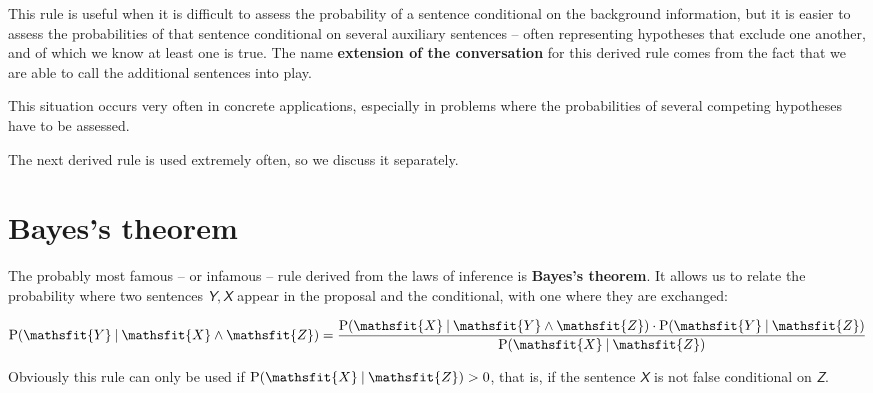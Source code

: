 \documentclass[
  a4paper,
  DIV=11,
  numbers=noendperiod,
  oneside]{scrreprt}
\begin{document}
This rule is useful when it is difficult to assess the probability of a
sentence conditional on the background information, but it is easier to
assess the probabilities of that sentence conditional on several
auxiliary sentences -- often representing hypotheses that exclude one
another, and of which we know at least one is true. The name
{\textbf{extension of the conversation}} for this derived rule comes
from the fact that we are able to call the additional sentences into
play.

This situation occurs very often in concrete applications, especially in
problems where the probabilities of several competing hypotheses have to
be assessed.

The next derived rule is used extremely often, so we discuss it
separately.

\hypertarget{sec-bayes-theorem}{%
\section{Bayes's theorem}\label{sec-bayes-theorem}}

The probably most famous -- or infamous -- rule derived from the laws of
inference is {\textbf{Bayes's theorem}}. It allows us to relate the
probability where two sentences \(\mathsfit{Y},\mathsfit{X}\) appear in
the proposal and the conditional, with one where they are exchanged:

\begin{tcolorbox}[enhanced jigsaw, colback=white, toptitle=1mm, title={{Derived rule: Bayes's theorem}}, arc=.35mm, toprule=.15mm, rightrule=.15mm, coltitle=black, opacityback=0, colframe=quarto-callout-note-color-frame, bottomtitle=1mm, colbacktitle=quarto-callout-note-color!10!white, left=2mm, leftrule=.75mm, titlerule=0mm, breakable, opacitybacktitle=0.6, bottomrule=.15mm]

\[
\mathrm{P}(\mathsfit{Y}\nonscript\:\vert\nonscript\:\mathopen{} \mathsfit{X}\land \mathsfit{Z}) =
\frac{\mathrm{P}(\mathsfit{X}\nonscript\:\vert\nonscript\:\mathopen{} \mathsfit{Y}\land \mathsfit{Z})\cdot \mathrm{P}(\mathsfit{Y}\nonscript\:\vert\nonscript\:\mathopen{} \mathsfit{Z})}{\mathrm{P}(\mathsfit{X}\nonscript\:\vert\nonscript\:\mathopen{} \mathsfit{Z})}
\]

\end{tcolorbox}

Obviously this rule can only be used if
{\(\mathrm{P}(\mathsfit{X}\nonscript\:\vert\nonscript\:\mathopen{} \mathsfit{Z}) > 0\),}
that is, if the sentence \(\mathsfit{X}\) is not false conditional on
{\(\mathsfit{Z}\).}
\end{document}

